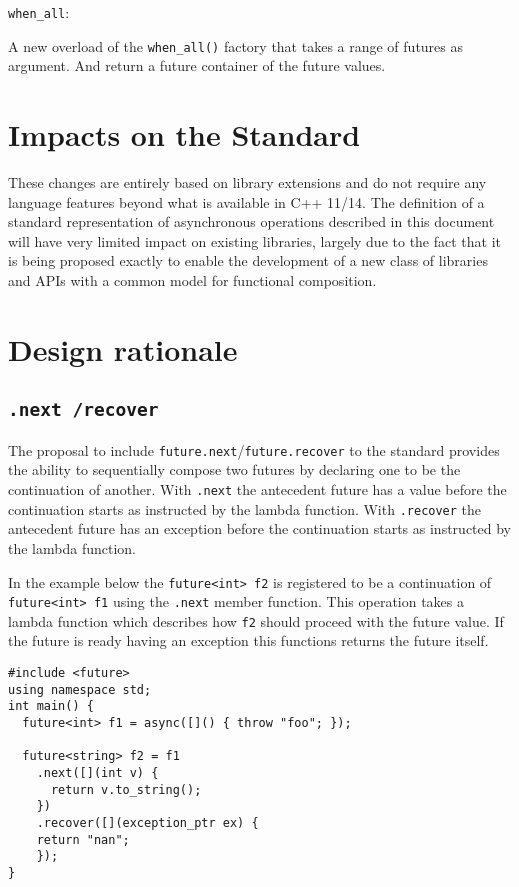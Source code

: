 \documentclass[a4paper,10pt]{article}
\newcommand{\cpp}[1]{\lstinline{#1}}
\begin{document}
\cpp{when_all}:

A new overload of the \cpp{when_all()} factory that takes a range of futures as argument. And return a future container of the future values.

\section{Impacts on the Standard}

These changes are entirely based on library extensions and do not require any language features beyond what is available in C++ 11/14. The definition of a standard representation of asynchronous operations described in this document will have very limited impact on existing libraries, largely due to the fact that it is being proposed exactly to enable the development of a new class of libraries and APIs with a common model for functional composition. 

\section{Design rationale}

\subsection{\cpp{.next /recover}}

The proposal to include \cpp{future.next}/\cpp{future.recover} to the standard provides the ability to sequentially compose two futures by declaring one to be the continuation of another. With \cpp{.next} the antecedent future has a value before the continuation starts as instructed by the lambda function. With \cpp{.recover} the antecedent future has an exception before the continuation starts as instructed by the lambda function.
 
In the example below the \cpp{future<int> f2} is registered to be a continuation of \cpp{future<int> f1} using the \cpp{.next} 
member function. This operation takes a lambda function which describes how \cpp{f2} should proceed with the future value. If the future is ready having an exception this functions returns the future itself.

\begin{lstlisting}[xleftmargin=0pt]
#include <future> 
using namespace std; 
int main() { 
  future<int> f1 = async([]() { throw "foo"; }); 
 
  future<string> f2 = f1
    .next([](int v) { 
      return v.to_string();
    })
    .recover([](exception_ptr ex) {
	return "nan";
    }); 
}
\end{lstlisting}
 
\end{document}
